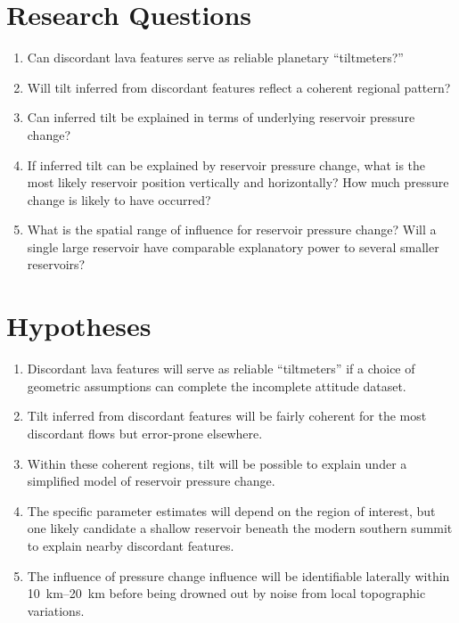 \section{Research Questions}

\begin{enumerate}
    \item Can discordant lava features serve as reliable planetary ``tiltmeters?''
    \item Will tilt inferred from discordant features reflect a coherent regional pattern?
    \item Can inferred tilt be explained in terms of underlying reservoir pressure change?
    \item If inferred tilt can be explained by reservoir pressure change, what is the most likely reservoir position vertically and horizontally? How much pressure change is likely to have occurred?
    \item What is the spatial range of influence for reservoir pressure change? Will a single large reservoir have comparable explanatory power to several smaller reservoirs? 
\end{enumerate}

\section{Hypotheses}

\begin{enumerate}
    \item Discordant lava features will serve as reliable ``tiltmeters'' if a choice of geometric assumptions can complete the incomplete attitude dataset.
    \item Tilt inferred from discordant features will be fairly coherent for the most discordant flows but error-prone elsewhere.
    \item Within these coherent regions, tilt will be possible to explain under a simplified model of reservoir pressure change.  
    \item The specific parameter estimates will depend on the region of interest, but one likely candidate a shallow reservoir beneath the modern southern summit to explain nearby discordant features.
    \item The influence of pressure change influence will be identifiable laterally within \qtyrange{10}{20}{\km} before being drowned out by noise from local topographic variations.
\end{enumerate}